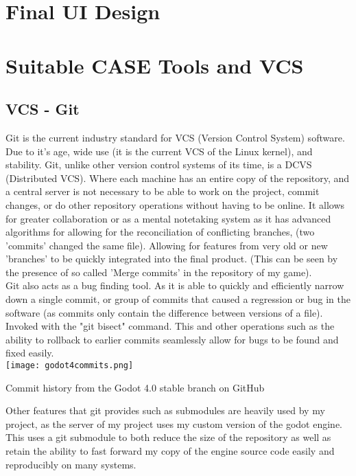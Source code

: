 \documentclass[12pt, DIV=calc]{scrartcl}
\begin{document}
\clearpage
\section{Final UI Design}




\clearpage
\section{Suitable CASE Tools and VCS}
\subsection{VCS - Git}
Git is the current industry standard for VCS (Version Control System) software. Due to it's age, wide use (it is the current VCS of the Linux kernel), and stability. Git, unlike other version control systems of its time, is a DCVS (Distributed VCS). Where each machine has an entire copy of the repository, and a central server is not necessary to be able to work on the project, commit changes, or do other repository operations without having to be online. It allows for greater collaboration or as a mental notetaking system as it has advanced algorithms for allowing for the reconciliation of conflicting branches, (two 'commits' changed the same file). Allowing for features from very old or new 'branches' to be quickly integrated into the final product. (This can be seen by the presence of so called 'Merge commits' in the repository of my game). \\

Git also acts as a bug finding tool. As it is able to quickly and efficiently narrow down a single commit, or group of commits that caused a regression or bug in the software (as commits only contain the difference between versions of a file). Invoked with the "git bisect" command. This and other operations such as the ability to rollback to earlier commits seamlessly allow for bugs to be found and fixed easily.\\

\texttt{[image: godot4commits.png]}
\caption{Commit history from the Godot 4.0 stable branch on GitHub \cite{godotgithub}}

Other features that git provides such as submodules are heavily used by my project, as the server of my project uses my custom version of the godot engine. This uses a git submodule to both reduce the size of the repository as well as retain the ability to fast forward my copy of the engine source code easily and reproducibly on many systems.
\end{document}
